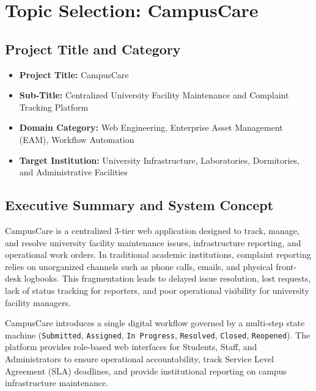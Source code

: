 \documentclass[12pt, a4paper]{article}
\begin{document}
\newpage

\section{Topic Selection: CampusCare}

\subsection{Project Title and Category}
\begin{itemize}
    \item \textbf{Project Title:} CampusCare
    \item \textbf{Sub-Title:} Centralized University Facility Maintenance and Complaint Tracking Platform
    \item \textbf{Domain Category:} Web Engineering, Enterprise Asset Management (EAM), Workflow Automation
    \item \textbf{Target Institution:} University Infrastructure, Laboratories, Dormitories, and Administrative Facilities
\end{itemize}

\vspace{1.0em}

\subsection{Executive Summary and System Concept}
CampusCare is a centralized 3-tier web application designed to track, manage, and resolve university facility maintenance issues, infrastructure reporting, and operational work orders. In traditional academic institutions, complaint reporting relies on unorganized channels such as phone calls, emails, and physical front-desk logbooks. This fragmentation leads to delayed issue resolution, lost requests, lack of status tracking for reporters, and poor operational visibility for university facility managers.

CampusCare introduces a single digital workflow governed by a multi-step state machine (\texttt{Submitted}, \texttt{Assigned}, \texttt{In Progress}, \texttt{Resolved}, \texttt{Closed}, \texttt{Reopened}). The platform provides role-based web interfaces for Students, Staff, and Administrators to ensure operational accountability, track Service Level Agreement (SLA) deadlines, and provide institutional reporting on campus infrastructure maintenance.
\end{document}
